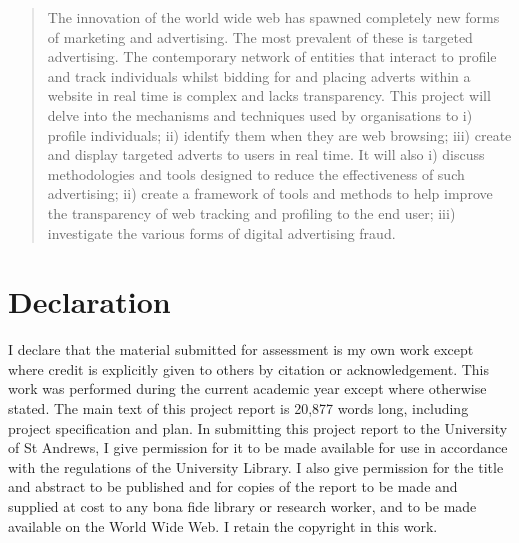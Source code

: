 \documentclass[12pt]{article}
\begin{document}
\pagestyle{plain}
\begin{abstract}
The innovation of the world wide web has spawned completely new forms of marketing and advertising. The most prevalent of these  is targeted advertising. The contemporary network of entities that interact to profile and track individuals whilst  bidding for and placing adverts within a website in real time is complex and lacks transparency. This project will delve into the mechanisms and techniques used by organisations to i) profile individuals; ii) identify them when they are web browsing; iii) create and display targeted adverts to users in real time. It will also i) discuss methodologies and tools designed to reduce the effectiveness of such advertising;  ii) create a framework of tools and methods to help improve the transparency of web tracking and profiling to the end user; iii) investigate the various forms of digital advertising fraud.  
\end{abstract}

\section{Declaration}
I declare that the material submitted for assessment is my own work except where credit is explicitly given to others by citation or acknowledgement. This work was performed during the current academic year except where otherwise stated. The main text of this project report is 20,877 words long, including project specification and plan. In submitting this project report to the University of St Andrews, I give permission for it to be made available for use in accordance with the regulations of the University Library. I also give permission for the title and abstract to be published and for copies of the report to be made and supplied at cost to any bona fide library or research worker, and to be made available on the World Wide Web. I retain the copyright in this work.

\pagebreak

\tableofcontents

\pagebreak

\pagestyle{fancy}
\end{document}
